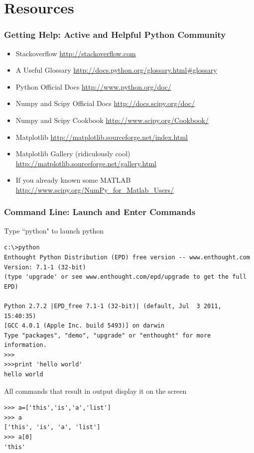 \documentclass{beamer}
\begin{document}
\section[]{Resources}
\begin{frame}[fragile]
\frametitle{Getting Help: Active and Helpful Python Community}
\begin{itemize}
\item Stackoverflow \url{http://stackoverflow.com}
\pause
\item A Useful Glossary \url{http://docs.python.org/glossary.html#glossary}
\pause
\item Python Official Docs \url{http://www.python.org/doc/}
\item Numpy and Scipy Official Docs \url{http://docs.scipy.org/doc/}
\pause
\item Numpy and Scipy Cookbook \url{http://www.scipy.org/Cookbook/}
\pause
\item Matplotlib \url{http://matplotlib.sourceforge.net/index.html}
\item Matplotlib Gallery (ridiculously cool) \url{http://matplotlib.sourceforge.net/gallery.html}
\pause
\item If you already known some MATLAB \url{http://www.scipy.org/NumPy_for_Matlab_Users/}
\end{itemize}
\end{frame}

\begin{frame}[fragile]
\frametitle{Command Line: Launch and Enter Commands}

Type ``python" to launch python
\begin{lstlisting}
c:\>python
Enthought Python Distribution (EPD) free version -- www.enthought.com
Version: 7.1-1 (32-bit)
(type 'upgrade' or see www.enthought.com/epd/upgrade to get the full EPD)

Python 2.7.2 |EPD_free 7.1-1 (32-bit)| (default, Jul  3 2011, 15:40:35) 
[GCC 4.0.1 (Apple Inc. build 5493)] on darwin
Type "packages", "demo", "upgrade" or "enthought" for more information.
>>>
>>>print 'hello world'
hello world
\end{lstlisting}
\pause
All commands that result in output display it on the screen
\begin{lstlisting}
>>> a=['this','is','a','list']
>>> a
['this', 'is', 'a', 'list']
>>> a[0]
'this'
\end{lstlisting}

\end{frame}
\end{document}
